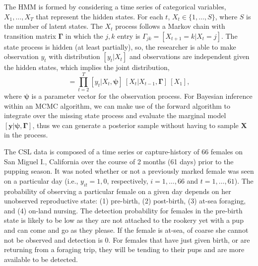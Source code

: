 \documentclass[12pt,english]{article}
\begin{document}
\begin{spacing}{1.9}
    The HMM is formed by considering a time series of categorical variables, $X_{1}, \dots, X_{T}$ that represent the hidden states. For each $t$, $X_{t} \in \{1, \dots, S\}$, where $S$ is the number of latent states. The $X_t$ process follows a Markov chain with transition matrix $\boldsymbol{\Gamma}$ in which the $j,k$ entry is $\Gamma_{jk} = [X_{t+1} = k | X_t = j]$. The state process is hidden (at least partially), so, the researcher is able to make observation $y_t$ with distribution $[y_t|X_t]$ and observations are independent given the hidden states, which implies the joint distribution,
    \begin{equation}
    [\mathbf{y}, \mathbf{X}| \boldsymbol{\psi}, \boldsymbol{\Gamma}] = \prod_{t=2}^T [y_t|X_t, \boldsymbol{\psi}]\ [X_t|X_{t-1},\boldsymbol{\Gamma}]\ [X_1],
    \end{equation}
 where $\boldsymbol{\psi}$ is a parameter vector for the observation process. For Bayesian inference within an MCMC algorithm, we can make use of the forward algorithm \citep[see][]{zucchini2009hidden} to integrate over the missing state process and evaluate the marginal model $[\mathbf{y}|\boldsymbol{\psi}, \boldsymbol{\Gamma}]$, thus we can generate a posterior sample without having to sample $\boldsymbol{X}$ in the process. 
 
 The CSL data is composed of a time series or capture-history of 66 females on San Miguel I., California over the course of 2 months (61 days) prior to the pupping season. It was noted whether or not a previously marked female was seen on a particular day (i.e., $y_{it} =1,0$, respectively, $i=1,\dots,66$ and $t=1,\dots,61$). The probability of observing a particular female on a given day depends on her unobserved reproductive state: (1) pre-birth, (2) post-birth, (3) at-sea foraging, and (4) on-land nursing. The detection probability for females in the pre-birth state is likely to be low as they are not attached to the rookery yet with a pup and can come and go as they please. If the female is at-sea, of coarse she cannot not be observed and detection is 0. For females that have just given birth, or are returning from a foraging trip, they will be tending to their pups and are more available to be detected. 
 

\end{spacing}
\end{document}
